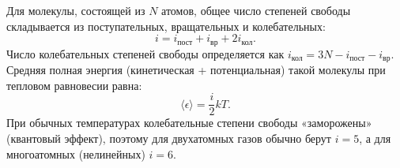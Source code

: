 \begin{definition}
Для молекулы, состоящей из $N$ атомов, общее число степеней свободы складывается из поступательных, вращательных и колебательных:
\begin{equation}
    i = i_{\text{пост}} + i_{\text{вр}} + 2i_{\text{кол}}.
\end{equation}
Число колебательных степеней свободы определяется как $i_{\text{кол}} = 3N - i_{\text{пост}} - i_{\text{вр}}$.
Средняя полная энергия (кинетическая + потенциальная) такой молекулы при тепловом равновесии равна:
\begin{equation}
    \langle \epsilon \rangle = \frac{i}{2} k T. \label{eq:poly_energy_41}
\end{equation}
При обычных температурах колебательные степени свободы «заморожены» (квантовый эффект), поэтому для двухатомных газов обычно берут $i=5$, а для многоатомных (нелинейных) $i=6$.
\end{definition}
